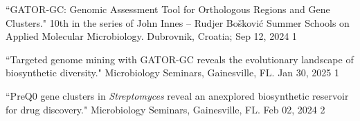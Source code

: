 

 \vspace{-2mm}

\begin{cvpubs}


\cvpub
{``GATOR‐GC: Genomic Assessment Tool for Orthologous Regions and Gene Clusters." 10th in the series of John Innes – Rudjer Bošković Summer Schools on Applied Molecular Microbiology. Dubrovnik, Croatia; Sep 12, 2024}
{1}

\end{cvpubs}


 \vspace{-2mm}

\begin{cvpubs} 


\cvpub
{``Targeted genome mining with GATOR-GC reveals the evolutionary landscape of biosynthetic diversity." Microbiology Seminars, Gainesville, FL. Jan 30, 2025}
{1}

\cvpub
{``PreQ0 gene clusters in \textit{Streptomyces} reveal an anexplored biosynthetic reservoir for drug discovery." Microbiology Seminars, Gainesville, FL. Feb 02, 2024}
{2}

\end{cvpubs}


\newpage
{} \vspace{-2mm}

